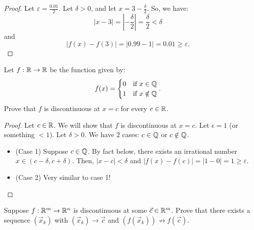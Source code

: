 \begin{proof}
Let $\varepsilon = \frac {0.01}2$. Let $\delta > 0$, and let $x = 3 - \frac \delta 2$. So, we have:
\[
|x-3| = \left|-\frac \delta 2\right| = \frac \delta 2 < \delta
\]
and 
\[
|f(x) - f(3)| = |0.99 - 1| = 0.01 \ge \varepsilon.
\]
\end{proof}

\begin{example}
Let $f : \mathbb{R} \to \mathbb{R}$ be the function given by:
\[
f(x) = \begin{cases}
0 & \text{if }x \in \mathbb{Q} \\
1 & \text{if }x \notin \mathbb{Q}
\end{cases}.
\]
Prove that $f$ is discontinuous at $x = c$ for every $c \in \mathbb{R}$.
\end{example}

\begin{proof}
Let $c \in \mathbb{R}$. We will show that $f$ is discontinuous at $x = c$. Let $\epsilon = 1$ (or something $< 1$). Let $\delta > 0$. We have $2$ cases: $c \in \mathbb{Q}$ or $c \notin \mathbb{Q}$.
\begin{itemize}
    \item (Case 1) Suppose $c \in \mathbb{Q}$. By fact below, there exists an irrational number $x \in (c - \delta, c + \delta)$. Then, $|x - c| < \delta$ and $|f(x) - f(c)| = |1 - 0| = 1 \ge \varepsilon$.
    \item (Case 2) Very similar to case 1!
\end{itemize}
\end{proof}

\begin{example}
Suppose $f : \mathbb{R}^m \to \mathbb{R}^n$ is discontinuous at some $\vec c \in \mathbb{R}^m$. Prove that there exists a sequence $(\vec x_k)$ with $(\vec x_k) \to \vec c$ and $(f(\vec x_k)) \nrightarrow f(\vec c)$.
\end{example}

